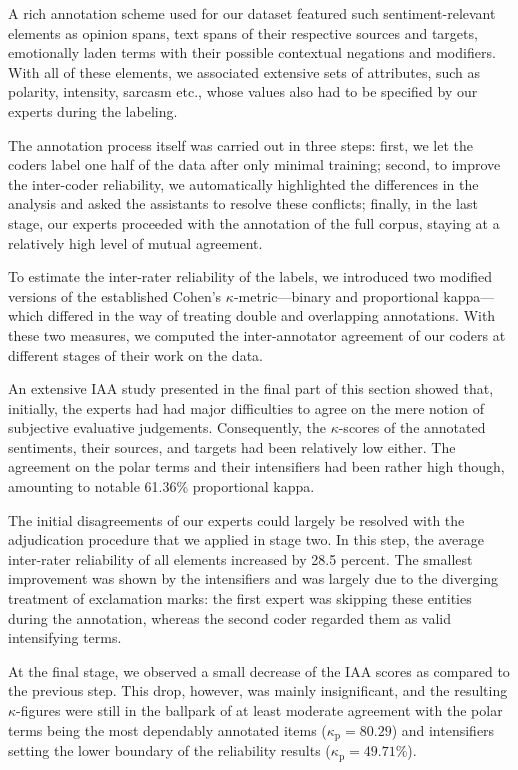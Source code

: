 A rich annotation scheme used for our dataset featured such
sentiment-relevant elements as opinion spans, text spans of their
respective sources and targets, emotionally laden terms with their
possible contextual negations and modifiers.  With all of these
elements, we associated extensive sets of attributes, such as
polarity, intensity, sarcasm etc., whose values also had to be
specified by our experts during the labeling.

The annotation process itself was carried out in three steps: first,
we let the coders label one half of the data after only minimal
training; second, to improve the inter-coder reliability, we
automatically highlighted the differences in the analysis and asked
the assistants to resolve these conflicts; finally, in the last stage,
our experts proceeded with the annotation of the full corpus, staying
at a relatively high level of mutual agreement.

To estimate the inter-rater reliability of the labels, we introduced
two modified versions of the established Cohen's
$\kappa$-metric---binary and proportional kappa---which differed in
the way of treating double and overlapping annotations.  With these
two measures, we computed the inter-annotator agreement of our coders
at different stages of their work on the data.

An extensive IAA study presented in the final part of this section
showed that, initially, the experts had had major difficulties to
agree on the mere notion of subjective evaluative judgements.
Consequently, the $\kappa$-scores of the annotated sentiments, their
sources, and targets had been relatively low either.  The agreement on
the polar terms and their intensifiers had been rather high
though, amounting to notable 61.36\% proportional kappa.

The initial disagreements of our experts could largely be resolved
with the adjudication procedure that we applied in stage two.  In this
step, the average inter-rater reliability of all elements increased by
28.5 percent.  The smallest improvement was shown by the intensifiers
and was largely due to the diverging treatment of exclamation marks:
the first expert was skipping these entities during the annotation,
whereas the second coder regarded them as valid intensifying terms.

At the final stage, we observed a small decrease of the IAA scores as
compared to the previous step.  This drop, however, was mainly
insignificant, and the resulting $\kappa$-figures were still in the
ballpark of at least moderate agreement with the polar terms
being the most dependably annotated items ($\kappa_\textrm{p}=80.29$)
and intensifiers setting the lower boundary of the reliability results
($\kappa_{\textrm{p}}=49.71\%$).

